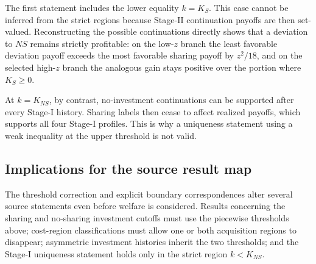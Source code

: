 The first statement includes the lower equality \(k=K_S\).  This case cannot be inferred from the strict regions because Stage-II continuation payoffs are then set-valued.  Reconstructing the possible continuations directly shows that a deviation to \(NS\) remains strictly profitable: on the low-\(z\) branch the least favorable deviation payoff exceeds the most favorable sharing payoff by \(z^2/18\), and on the selected high-\(z\) branch the analogous gain stays positive over the portion where \(K_S\ge0\).

At \(k=K_{NS}\), by contrast, no-investment continuations can be supported after every Stage-I history.  Sharing labels then cease to affect realized payoffs, which supports all four Stage-I profiles.  This is why a uniqueness statement using a weak inequality at the upper threshold is not valid.

\subsection{Implications for the source result map}

The threshold correction and explicit boundary correspondences alter several source statements even before welfare is considered.  Results concerning the sharing and no-sharing investment cutoffs must use the piecewise thresholds above; cost-region classifications must allow one or both acquisition regions to disappear; asymmetric investment histories inherit the two thresholds; and the Stage-I uniqueness statement holds only in the strict region \(k<K_{NS}\).
